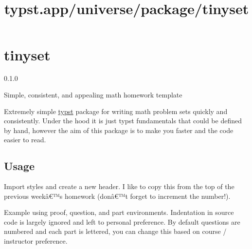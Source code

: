 \title{typst.app/universe/package/tinyset}

\label{banner}
\section{tinyset}\label{tinyset}

{ 0.1.0 }

Simple, consistent, and appealing math homework template

\label{readme}
Extremely simple \href{https://github.com/typst/typst}{typst} package
for writing math problem sets quickly and consistently. Under the hood
it is just typst fundamentals that could be defined by hand, however the
aim of this package is to make you faster and the code easier to read.

\subsection{Usage}\label{usage}

Import styles and create a new header. I like to copy this from the top
of the previous weekâ€™s homework (donâ€™t forget to increment the
number!).

Example using proof, question, and part environments. Indentation in
source code is largely ignored and left to personal preference. By
default questions are numbered and each part is lettered, you can change
this based on course / instructor preference.

\begin{Shaded}
\begin{Highlighting}[]

\NormalTok{+ \#qs[}


\NormalTok{+ \#pt[ }
\NormalTok{    \#prf[ Non empty: Since $H$ is a subgroup it contains the indentity, and}
\NormalTok{    since $phi$ is a homomorphism and ... ]}
\NormalTok{]}

\NormalTok{+ \#pt[ }
\NormalTok{]}

\NormalTok{]}
\end{Highlighting}
\end{Shaded}

